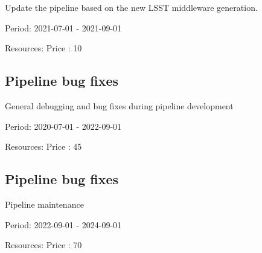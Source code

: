 Update the pipeline based on the new LSST middleware generation.

Period: 2021-07-01 - 2021-09-01

Resources: Price : 10

\subsection{Pipeline bug fixes}

General debugging and bug fixes during pipeline development

Period: 2020-07-01 - 2022-09-01

Resources: Price : 45

\subsection{Pipeline bug fixes}

Pipeline maintenance

Period: 2022-09-01 - 2024-09-01

Resources: Price : 70

